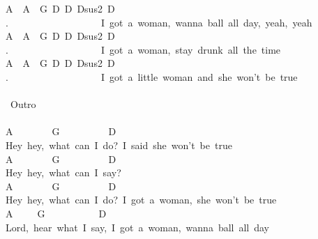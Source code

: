 {A\ \ A\ \ G\ D\ D\ Dsus2\ D\ \ \ \ \ \ \ \ \ \ \ \ \ \ \ \\
.\ \ \ \ \ \ \ \ \ \ \ \ \ \ \ \ \ \ \ I\ got\ a\ woman,\ wanna\ ball\ all\ day,\ yeah,\ yeah\\
A\ \ A\ \ G\ D\ D\ Dsus2\ D\ \ \ \ \ \ \ \ \ \ \ \ \ \ \ \\
.\ \ \ \ \ \ \ \ \ \ \ \ \ \ \ \ \ \ \ I\ got\ a\ woman,\ stay\ drunk\ all\ the\ time\\
A\ \ A\ \ G\ D\ D\ Dsus2\ D\ \ \ \ \ \ \ \ \ \ \ \ \ \ \ \\
.\ \ \ \ \ \ \ \ \ \ \ \ \ \ \ \ \ \ \ I\ got\ a\ little\ woman\ and\ she\ won't\ be\ true\\
\\
\lbrack\ Outro\rbrack\\
\\
A\ \ \ \ \ \ \ \ G\ \ \ \ \ \ \ \ \ \ D\\
Hey\ hey,\ what\ can\ I\ do?\ I\ said\ she\ won't\ be\ true\\
A\ \ \ \ \ \ \ \ G\ \ \ \ \ \ \ \ \ \ D\\
Hey\ hey,\ what\ can\ I\ say?\\
A\ \ \ \ \ \ \ \ G\ \ \ \ \ \ \ \ \ \ D\\
Hey\ hey,\ what\ can\ I\ do?\ I\ got\ a\ woman,\ she\ won't\ be\ true\\
A\ \ \ \ \ G\ \ \ \ \ \ \ \ \ \ \ D\\
Lord,\ hear\ what\ I\ say,\ I\ got\ a\ woman,\ wanna\ ball\ all\ day\\}
